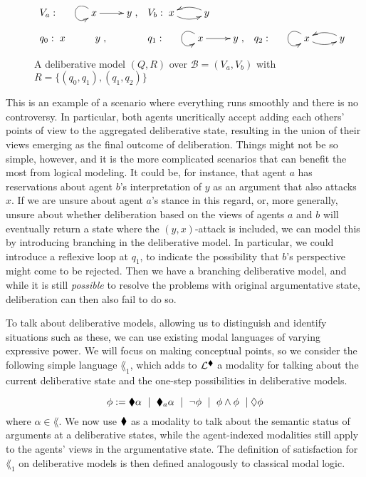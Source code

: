 \documentclass[greybox]{svmult}
\newcommand{\views}{\mathcal B}
\begin{document}
\begin{figure}
$\begin{array}{llllll}
V_a: \xymatrix{& x \ar[r] \ar@(lu,ld) & y}, & V_b: \xymatrix{x \ar@/_/[r] & y \ar@/_/[l] } \\ \\
q_0: \xymatrix{ x & y }, & q_1: \xymatrix{& x \ar@(lu,ld)  \ar[r] & y }, & q_2: \xymatrix{&  x \ar@(lu,ld)  \ar@/_/[r] & y \ar@/_/[l]}
\end{array}$
\caption{A deliberative model $(Q,R)$ over $\views = (V_a,V_b)$ with $R = \{(q_0,q_1),(q_1,q_2)\}$}
\label{fig:del1}
\end{figure}

This is an example of a scenario where everything runs smoothly and there is no controversy. In particular, both agents uncritically accept adding each others' points of view to the aggregated deliberative state, resulting in the union of their views emerging as the final outcome of deliberation. Things might not be so simple, however, and it is the more complicated scenarios that can benefit the most from logical modeling. It could be, for instance, that agent $a$ has reservations about agent $b$'s interpretation of $y$ as an argument that also attacks $x$. If we are unsure about agent $a$'s stance in this regard, or, more generally, unsure about whether deliberation based on the views of agents $a$ and $b$ will eventually return a state where the $(y,x)$-attack is included, we can model this by introducing branching in the deliberative model. In particular, we could introduce a reflexive loop at $q_1$, to indicate the possibility that $b$'s perspective might come to be rejected. Then we have a branching deliberative model, and while it is still \emph{possible} to resolve the problems with original argumentative state, deliberation can then also fail to do so. 

To talk about deliberative models, allowing us to distinguish and identify situations such as these, we can use existing modal languages of varying expressive power. We will focus on making conceptual points, so we consider the following simple language $\lang_1$, which adds to $\mathcal L^{\blacklozenge}$ a modality for talking about the current deliberative state and the one-step possibilities in deliberative models.

$$
\phi := \blacklozenge \alpha \ \mid \ \blacklozenge_a \alpha \ \mid \ \neg \phi \ \mid \ \phi \land \phi \ \mid \lozenge \phi
$$
where $\alpha \in \lang$. We now use $\blacklozenge$ as a modality to talk about the semantic status of arguments at a deliberative states, while the agent-indexed modalities still apply to the agents' views in the argumentative state. The definition of satisfaction for $\lang_1$ on deliberative models is then defined analogously to classical modal logic.
\end{document}
